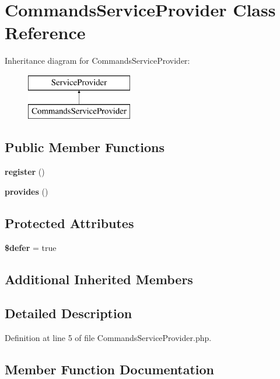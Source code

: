 \section{Commands\+Service\+Provider Class Reference}
\label{class_illuminate_1_1_session_1_1_commands_service_provider}
Inheritance diagram for Commands\+Service\+Provider\+:\begin{figure}[H]
\begin{center}
\leavevmode
\includegraphics[height=2.000000cm]{class_illuminate_1_1_session_1_1_commands_service_provider}
\end{center}
\end{figure}
\subsection*{Public Member Functions}
\begin{DoxyCompactItemize}
\item 
{\bf register} ()
\item 
{\bf provides} ()
\end{DoxyCompactItemize}
\subsection*{Protected Attributes}
\begin{DoxyCompactItemize}
\item 
{\bf \$defer} = true
\end{DoxyCompactItemize}
\subsection*{Additional Inherited Members}


\subsection{Detailed Description}


Definition at line 5 of file Commands\+Service\+Provider.\+php.



\subsection{Member Function Documentation}
